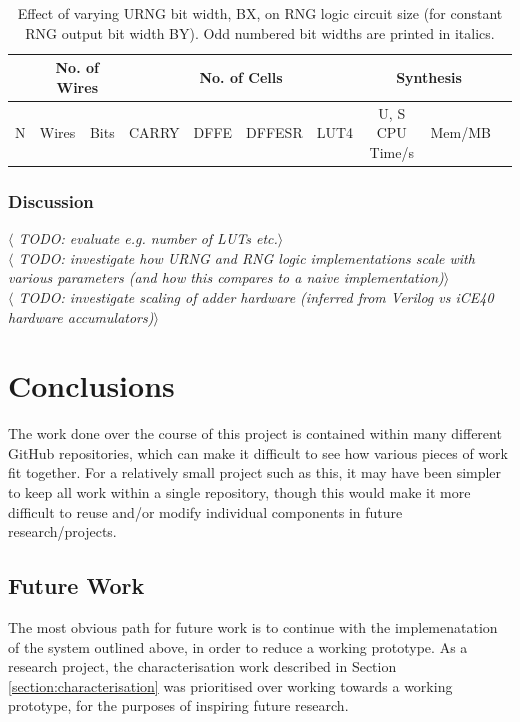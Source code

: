 \documentclass[12pt]{article}
\begin{document}
      \begin{table}[H]
        \centering
        \begin{tabular}{|c||c|c|c|c|c|c|c|c|c|}
          \hline
          &
          \multicolumn{2}{|c|}{No. of Wires}
          &
          \multicolumn{4}{|c|}{No. of Cells}
          &
          \multicolumn{2}{|c|}{Synthesis}\\
          \hline
          N & Wires & Bits & CARRY & DFFE & DFFESR & LUT4 & U, S CPU Time/s & Mem/MB\\
          \hline
          \hline

          \hline
        \end{tabular}
        \caption{Effect of varying URNG bit width, BX, on RNG logic circuit size (for constant RNG output bit width BY). Odd numbered bit widths are printed in italics.}
        \label{table:rng_bx}
      \end{table}
    \subsubsection{Discussion}


    \textit{$\langle$ TODO: evaluate e.g. number of LUTs etc.$\rangle$}\\
    \textit{$\langle$ TODO: investigate how URNG and RNG logic implementations scale with various parameters (and how this compares to a naive implementation)$\rangle$}\\

    \textit{$\langle$ TODO: investigate scaling of adder hardware (inferred from Verilog vs iCE40 hardware accumulators)$\rangle$}
\newpage



%
%

\section{Conclusions}

  The work done over the course of this project is contained within many different GitHub repositories, which can make it difficult to see how various pieces of work fit together. For a relatively small project such as this, it may have been simpler to keep all work within a single repository, though this would make it more difficult to reuse and/or modify individual components in future research/projects.

  \subsection{Future Work}
    The most obvious path for future work is to continue with the implemenatation of the system outlined above, in order to reduce a working prototype. As a research project, the characterisation work described in Section \ref{section:characterisation} was prioritised over working towards a working prototype, for the purposes of inspiring future research.\\
\end{document}
